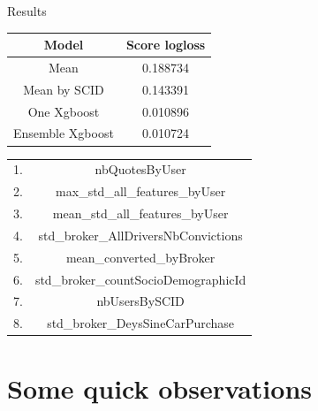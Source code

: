 \begin{frame}{Results}
	
	\begin{table}[h]
		\centering
			\begin{tabular}{|c|c|}
				\hline
				Model & Score logloss \\ \hline \hline
				Mean & 0.188734 \\
				Mean by SCID & 0.143391 \\
				\hline
				One Xgboost & 0.010896 \\
				Ensemble Xgboost & 0.010724\\
				\hline
			\end{tabular}
			\label{table:cnnbenchmark}
		\end{table}
		\begin{table}[h]
			\centering
			\begin{tabular}{|c|c|}
				\hline
		1. & nbQuotesByUser\\	
		2.& max\_std\_all\_features\_byUser\\
		3. &mean\_std\_all\_features\_byUser\\
		4. &std\_broker\_AllDriversNbConvictions\\
		5. &mean\_converted\_byBroker\\
		6. &std\_broker\_countSocioDemographicId\\
		7. &nbUsersBySCID\\
		8. &std\_broker\_DeysSineCarPurchase\\
		\hline
	\end{tabular}
	\label{table:cnnbenchmark}
\end{table}
		
	
\end{frame}

\section{Some quick observations} \subsection{}\label{}

